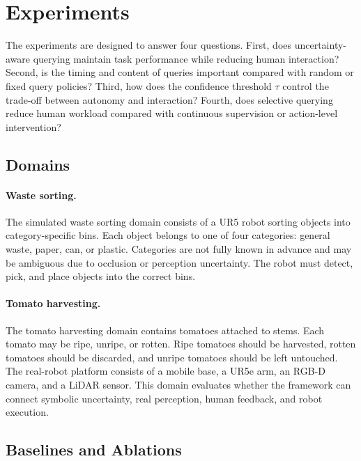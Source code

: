 \section{Experiments}
\label{sec:experiments}

The experiments are designed to answer four questions. First, does uncertainty-aware querying maintain task performance while reducing human interaction? Second, is the timing and content of queries important compared with random or fixed query policies? Third, how does the confidence threshold $\tau$ control the trade-off between autonomy and interaction? Fourth, does selective querying reduce human workload compared with continuous supervision or action-level intervention?

\subsection{Domains}


\paragraph{Waste sorting.}
The simulated waste sorting domain consists of a UR5 robot sorting objects into category-specific bins. Each object belongs to one of four categories: general waste, paper, can, or plastic. Categories are not fully known in advance and may be ambiguous due to occlusion or perception uncertainty. The robot must detect, pick, and place objects into the correct bins.

\paragraph{Tomato harvesting.}
The tomato harvesting domain contains tomatoes attached to stems. Each tomato may be ripe, unripe, or rotten. Ripe tomatoes should be harvested, rotten tomatoes should be discarded, and unripe tomatoes should be left untouched. The real-robot platform consists of a mobile base, a UR5e arm, an RGB-D camera, and a LiDAR sensor. This domain evaluates whether the framework can connect symbolic uncertainty, real perception, human feedback, and robot execution.

\subsection{Baselines and Ablations}

